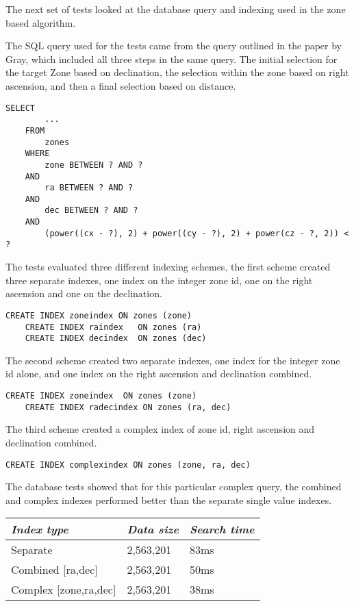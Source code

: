 \documentclass{article}
\begin{document}
The next set of tests looked at the database query and indexing used in the zone based algorithm.

The SQL query used for the tests came from the query outlined in the paper by Gray, which included all three steps in the same query. The initial selection for the target Zone based on declination, the selection within the zone based on right ascension, and then a final selection based on distance.

\begin{lstlisting}[style=SQL]
    SELECT
        ...
    FROM
        zones
    WHERE
        zone BETWEEN ? AND ?
    AND
        ra BETWEEN ? AND ?
    AND
        dec BETWEEN ? AND ?
    AND
        (power((cx - ?), 2) + power((cy - ?), 2) + power(cz - ?, 2)) < ?
\end{lstlisting}

The tests evaluated three different indexing schemes, the first scheme created three separate indexes, one index on the integer zone id, one on the right ascension and one on the declination.

\begin{lstlisting}[style=SQL]
    CREATE INDEX zoneindex ON zones (zone)
    CREATE INDEX raindex   ON zones (ra)
    CREATE INDEX decindex  ON zones (dec)
\end{lstlisting}

The second scheme created two separate indexes, one index for the integer zone id alone, and one index on the right ascension and declination combined.

\begin{lstlisting}[style=SQL]
    CREATE INDEX zoneindex  ON zones (zone)
    CREATE INDEX radecindex ON zones (ra, dec)
\end{lstlisting}

The third scheme created a complex index of zone id, right ascension and declination combined.

\begin{lstlisting}[style=SQL]
    CREATE INDEX complexindex ON zones (zone, ra, dec)
\end{lstlisting}

The database tests showed that for this particular complex query, the combined and complex indexes performed better than the separate single value indexes.

\begin{table}[h]
\centering
\begin{tabular}{|l|l|l|}
\hline
\textit{Index type} & \textit{Data size} & \textit{Search time} \\ \hline
Separate & 2,563,201 & 83ms \\ \hline
Combined [ra,dec] & 2,563,201 & 50ms \\ \hline
Complex  [zone,ra,dec] & 2,563,201 & 38ms \\ \hline
\end{tabular}
\end{table}
\end{document}

